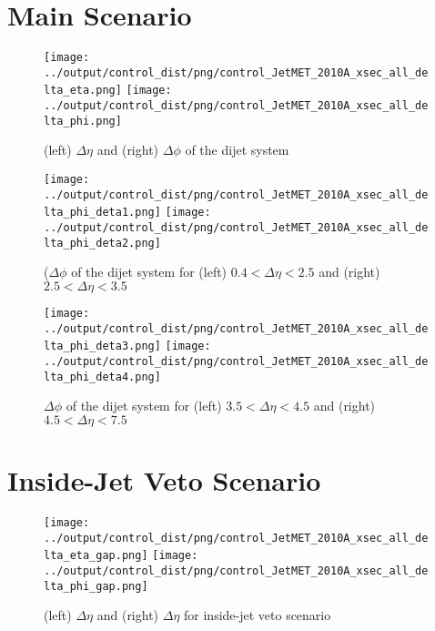 \documentclass[11pt]{article}
\begin{document}
\clearpage


\section{Main Scenario}

\begin{figure}[ht]
\centering
\texttt{[image: ../output/control\_dist/png/control\_JetMET\_2010A\_xsec\_all\_delta\_eta.png]}
\texttt{[image: ../output/control\_dist/png/control\_JetMET\_2010A\_xsec\_all\_delta\_phi.png]}
\caption{(left) $\Delta\eta$ and (right) $\Delta\phi$ of the dijet system}
\label{fig:deltas}
\end{figure}


\begin{figure}[ht]
\centering
\texttt{[image: ../output/control\_dist/png/control\_JetMET\_2010A\_xsec\_all\_delta\_phi\_deta1.png]}
\texttt{[image: ../output/control\_dist/png/control\_JetMET\_2010A\_xsec\_all\_delta\_phi\_deta2.png]}
\caption{($\Delta\phi$ of the dijet system for (left) $0.4 < \Delta\eta < 2.5$ and (right) $2.5 < \Delta\eta < 3.5$}
\label{fig:delta_deta1}
\end{figure}


\begin{figure}[ht]
\centering
\texttt{[image: ../output/control\_dist/png/control\_JetMET\_2010A\_xsec\_all\_delta\_phi\_deta3.png]}
\texttt{[image: ../output/control\_dist/png/control\_JetMET\_2010A\_xsec\_all\_delta\_phi\_deta4.png]}
\caption{$\Delta\phi$ of the dijet system for (left) $3.5 < \Delta\eta < 4.5$ and (right) $4.5 < \Delta\eta < 7.5$}
\label{fig:delta_deta2}
\end{figure}

\clearpage


\section{Inside-Jet Veto Scenario}

\begin{figure}[ht]
\centering
\texttt{[image: ../output/control\_dist/png/control\_JetMET\_2010A\_xsec\_all\_delta\_eta\_gap.png]}
\texttt{[image: ../output/control\_dist/png/control\_JetMET\_2010A\_xsec\_all\_delta\_phi\_gap.png]}
\caption{(left) $\Delta\eta$ and (right) $\Delta\eta$ for inside-jet veto scenario}
\label{fig:delta_gap}
\end{figure}
\end{document}
